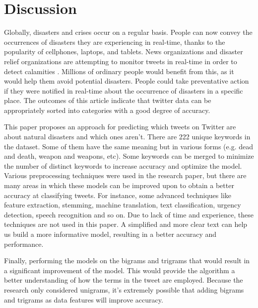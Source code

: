 \documentclass{article}
\begin{document}
\section{Discussion}

Globally, disasters and crises occur on a regular basis. People can now convey the occurrences of disasters they are experiencing in real-time, thanks to the popularity of cellphones, laptops, and tablets. News organizations and disaster relief organizations are attempting to monitor tweets in real-time in order to detect calamities \cite{6}. Millions of ordinary people would benefit from this, as it would help them avoid potential disasters. People could take preventative action if they were notified in real-time about the occurrence of disasters in a specific place. The outcomes of this article indicate that twitter data can be appropriately sorted into categories with a good degree of accuracy.

This paper proposes an approach for predicting which tweets on Twitter are about natural disasters and which ones aren't. There are 222 unique keywords in the dataset. Some of them have the same meaning but in various forms (e.g. dead and death, weapon and weapons, etc). Some keywords can be merged to minimize the number of distinct keywords to increase accuracy and optimize the model. Various preprocessing techniques were used in the research paper, but there are many areas in which these models can be improved upon to obtain a better accuracy at classifying tweets. For instance, some advanced techniques like feature extraction, stemming, machine translation, text classification, urgency detection, speech recognition and so on. Due to lack of time and experience, these techniques are not used in this paper. A simplified and more clear text can help us build a more informative model, resulting in a better accuracy and performance. 

Finally, performing the models on the bigrams and trigrams that would result in a significant improvement of the model. This would provide the algorithm a better understanding of how the terms in the tweet are employed. Because the research only considered unigrams, it's extremely possible that adding bigrams and trigrams as data features will improve accuracy.
















\pagebreak


\end{document}
